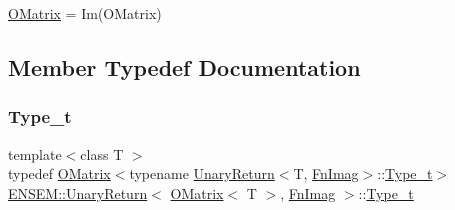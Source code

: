 \mbox{\hyperlink{classENSEM_1_1OMatrix}{O\+Matrix}} = Im(\+O\+Matrix) 

\subsection{Member Typedef Documentation}
\mbox{\label{structENSEM_1_1UnaryReturn_3_01OMatrix_3_01T_01_4_00_01FnImag_01_4_a0841f7311ee5495c55d754fd855f045c}} 
\subsubsection{\texorpdfstring{Type\_t}{Type\_t}\hspace{0.1cm}{\footnotesize\ttfamily [1/2]}}
{\footnotesize\ttfamily template$<$class T $>$ \\
typedef \mbox{\hyperlink{classENSEM_1_1OMatrix}{O\+Matrix}}$<$typename \mbox{\hyperlink{structENSEM_1_1UnaryReturn}{Unary\+Return}}$<$T, \mbox{\hyperlink{structENSEM_1_1FnImag}{Fn\+Imag}}$>$\+::\mbox{\hyperlink{structENSEM_1_1UnaryReturn_3_01OMatrix_3_01T_01_4_00_01FnImag_01_4_a0841f7311ee5495c55d754fd855f045c}{Type\+\_\+t}}$>$ \mbox{\hyperlink{structENSEM_1_1UnaryReturn}{E\+N\+S\+E\+M\+::\+Unary\+Return}}$<$ \mbox{\hyperlink{classENSEM_1_1OMatrix}{O\+Matrix}}$<$ T $>$, \mbox{\hyperlink{structENSEM_1_1FnImag}{Fn\+Imag}} $>$\+::\mbox{\hyperlink{structENSEM_1_1UnaryReturn_3_01OMatrix_3_01T_01_4_00_01FnImag_01_4_a0841f7311ee5495c55d754fd855f045c}{Type\+\_\+t}}}

\mbox{\label{structENSEM_1_1UnaryReturn_3_01OMatrix_3_01T_01_4_00_01FnImag_01_4_a0841f7311ee5495c55d754fd855f045c}} 
